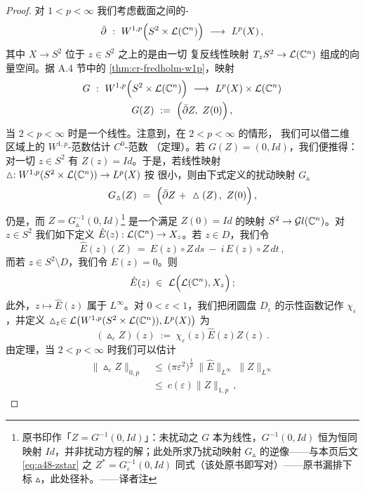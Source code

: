 \begin{proof}
对 $1<p<\infty$ 我们考虑截面之间的\trCauchy-\trRiemann\trOperator
\[
\bar{\partial}\ :\ W^{1,p}\Bigl(S^{2}\times\mathcal{L}(\C^{n})\Bigr)\ \longrightarrow\ L^{p}(X)\,,
\]
其中\trVectorBundle{} $X\to S^{2}$ 位于 $z\in S^{2}$ 之上的\trFiber{}是由一切%
复反线性映射 $T_{z}S^{2}\to\mathcal{L}(\mathbb{C}^{n})$ 组成的向量空间。据 A.4 节中的%
\cref{thm:cr-fredholm-w1p}，映射
\[
\begin{gathered}
G\ :\ W^{1,p}\Bigl(S^{2}\times\mathcal{L}(\C^{n})\Bigr)\ \longrightarrow\ L^{p}(X)\times\mathcal{L}(\C^{n})\\
G(Z)\ :=\ \Bigl(\bar{\partial}Z,\ Z(0)\Bigr)\,,
\end{gathered}
\]
当 $2<p<\infty$ 时是一个线性\trIsomorphism。注意到，在 $2<p<\infty$ 的情形，%
我们可以借二维区域上的 $W^{1,p}$-范数估计 $C^{0}$-范数%
（\trSobolev\trEmbedding{}定理）。若 $G(Z)=(0,Id)$，我们便推得：对一切 $z\in S^{2}$%
有 $Z(z)=Id$。于是，若线性映射%
 $\vartriangle:W^{1,p}(S^{2}\times\mathcal{L}(\mathbb{C}^{n}))\to L^{p}(X)$ 按%
\trOperator\trNorm{}很小，则由下式定义的扰动映射 $G_{\vartriangle}$
\[
G_{\vartriangle}(Z)\ =\ \Bigl(\bar{\partial}Z\ +\ \vartriangle(Z)\,,\ Z(0)\Bigr)\,,
\]
仍是\trIsomorphism，而 $Z=G_{\vartriangle}^{-1}(0,Id)$\footnote{原书印作「$Z=G^{-1}(0,Id)$」：未扰动之 $G$ 本为线性\trIsomorphism，$G^{-1}(0,Id)$ 恒为恒同映射 $Id$，并非扰动方程的解；此处所求乃扰动映射 $G_{\vartriangle}$ 的逆像——与本页后文 \eqref{eq:a48-zstar} 之 $Z^{*}=G_{\varepsilon}^{-1}(0,Id)$ 同式（该处原书即写对）——原书漏排下标 $\vartriangle$，此处径补。——译者注} 是一个满足 $Z(0)=Id$ 的映射%
 $S^{2}\to\mathcal{G}l(\mathbb{C}^{n})$。对 $z\in S^{2}$ 我们如下定义%
 $\hat{E}(z):\mathcal{L}(\mathbb{C}^{n})\to X_{z}$。若 $z\in D$，我们令
\[
\hat{E}(z)(Z)\ =\ E(z)\circ Z\,ds\ -\ i\,E(z)\circ Z\,dt\,,
\]
而若 $z\in S^{2}\setminus D$，我们令 $\hat{E}(z)=0$。则
\[
\hat{E}(z)\ \in\ \mathcal{L}\Bigl(\mathcal{L}(\C^{n}),X_{z}\Bigr)\,;
\]
此外，$z\mapsto\hat{E}(z)$ 属于 $L^{\infty}$。对 $0<\varepsilon<1$，我们把闭圆盘%
 $D_{\varepsilon}$ 的示性函数记作 $\chi_{\varepsilon}$，并定义%
 $\vartriangle_{\varepsilon}\in\mathcal{L}\bigl(W^{1,p}(S^{2}\times\mathcal{L}(\mathbb{C}^{n})),L^{p}(X)\bigr)$ 为
\[
(\vartriangle_{\varepsilon}Z)(z)\ :=\ \chi_{\varepsilon}(z)\hat{E}(z)Z(z)\,.
\]
由\trSobolev\trEmbedding{}定理，当 $2<p<\infty$ 时我们可以估计
\begin{align*}
\|\vartriangle_{\varepsilon}Z\|_{0,p}\ &\leq\ \bigl(\pi\varepsilon^{2}\bigr)^{\frac{1}{p}}\ \|\hat{E}\|_{L^{\infty}}\ \|Z\|_{L^{\infty}}\\
&\leq\ c(\varepsilon)\|Z\|_{1,p}\,,
\end{align*}

\end{proof}
